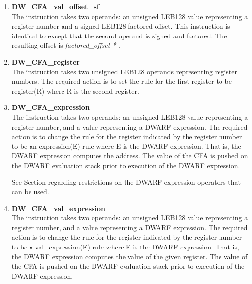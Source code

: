 \begin{enumerate}[1.]
\item \textbf{DW\-\_CFA\-\_val\-\_offset\-\_sf} \\
The  instruction takes two operands: an
unsigned LEB128 value representing a register number and a
signed LEB128 factored offset. This instruction is identical
to  except that the second operand is signed
and factored. The resulting offset is 
\textit{factored\_offset * }.

\item \textbf{DW\-\_CFA\-\_register} \\
The  instruction takes two unsigned LEB128
operands representing register numbers. The required action
is to set the rule for the first register to be register(R)
where R is the second register.

\item \textbf{DW\-\_CFA\-\_expression} \\
The  
instruction takes two operands: an
unsigned LEB128 value representing a register number, and
a  
value representing a DWARF expression. 
The
required action is to change the rule for the register
indicated by the register number to be an expression(E)
rule where E is the DWARF expression. That is, the DWARF
expression computes the address. The value of the CFA is
pushed on the DWARF evaluation stack prior to execution of
the DWARF expression.

See Section  
regarding restrictions on the DWARF
expression operators that can be used.

\item \textbf{DW\-\_CFA\-\_val\-\_expression} \\
The  instruction takes two operands:
an unsigned LEB128 value representing a register number, and
a  
value representing a DWARF expression. The
required action is to change the rule for the register
indicated by the register number to be a val\_expression(E)
rule where E is the DWARF expression. That is, the DWARF
expression computes the value of the given register. The value
of the CFA is pushed on the DWARF evaluation stack prior to
execution of the DWARF expression.


\end{enumerate}
